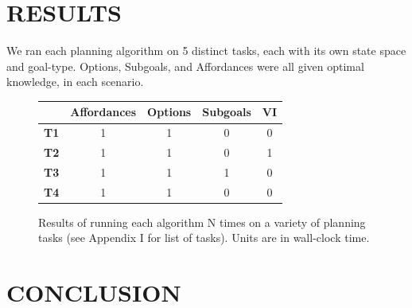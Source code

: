 \documentclass[]{article}
\begin{document}
\section{RESULTS}

We ran each planning algorithm on 5 distinct tasks, each with its own state space and goal-type. Options, Subgoals, and Affordances were all given optimal knowledge, in each scenario.


\begin{figure}
\begin{tabular}{ l || c | c | c | c }
  & Affordances & Options & Subgoals & VI \\
  \hline
  {\bf T1} & 1 & 1 & 0 & 0  \\
  {\bf T2} & 1 & 1 & 0 & 1 \\
  {\bf T3} & 1 & 1 & 1 & 0 \\
  {\bf T4} & 1 & 1 & 0 & 0\\
\end{tabular}
\caption{Results of running each algorithm N times on a variety 
of planning tasks (see Appendix I for list of tasks). Units are in 
wall-clock time.}
\end{figure}


\section{CONCLUSION}


  
\end{document}

